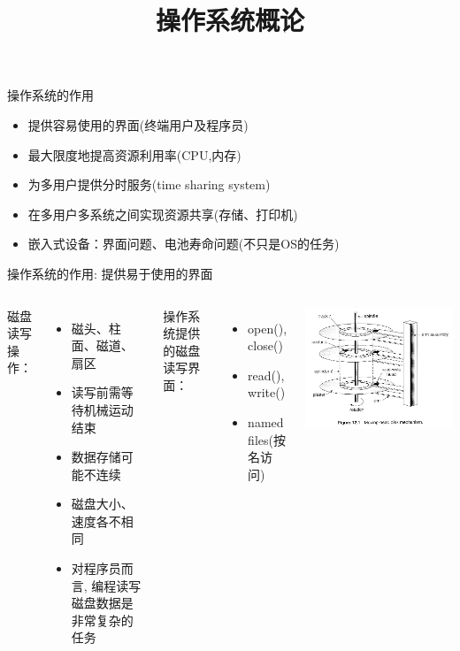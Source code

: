 \documentclass[xcolor=svgnames]{beamer}
\begin{document}
\begin{CJK*}{UTF8}{gbsn}


\title{操作系统概论}


\begin{frame}{操作系统的作用}
\begin{itemize}
\item 提供容易使用的界面(终端用户及程序员)
\item 最大限度地提高资源利用率(CPU,内存)
\item 为多用户提供分时服务(time sharing system)
\item 在多用户多系统之间实现资源共享(存储、打印机)
\item 嵌入式设备：界面问题、电池寿命问题(不只是OS的任务)
\end{itemize}
\end{frame}

\begin{frame}{操作系统的作用: 提供易于使用的界面}
\begin{columns}
磁盘读写操作：
\begin{itemize}
\item 磁头、柱面、磁道、扇区
\item 读写前需等待机械运动结束
\item 数据存储可能不连续
\item 磁盘大小、速度各不相同
\item 对程序员而言, 编程读写磁盘数据是非常复杂的任务
\end{itemize}

操作系统提供的磁盘读写界面：
\begin{itemize}
\item open(), close()
\item read(), write()
\item named files(按名访问)
\end{itemize}

\includegraphics[width=1.0\textwidth]{disk.jpg}
\end{columns}
\end{frame}


\end{CJK*}
\end{document}
